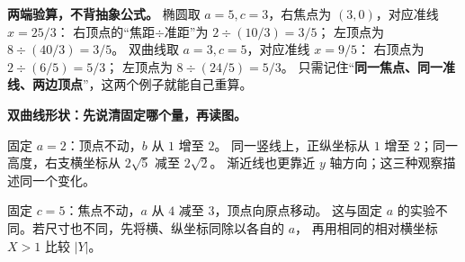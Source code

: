\begin{explanationbox}
\medskip
\textbf{两端验算，不背抽象公式。}
椭圆取 $a=5,c=3$，右焦点为 $(3,0)$，对应准线 $x=25/3$：
右顶点的“焦距$\div$准距”为 $2\div(10/3)=3/5$；
左顶点为 $8\div(40/3)=3/5$。
双曲线取 $a=3,c=5$，对应准线 $x=9/5$：
右顶点为 $2\div(6/5)=5/3$；
左顶点为 $8\div(24/5)=5/3$。
只需记住“\textbf{同一焦点、同一准线、两边顶点}”，这两个例子就能自己重算。


\medskip
\textbf{双曲线形状：先说清固定哪个量，再读图。}

固定 $a=2$：顶点不动，$b$ 从 $1$ 增至 $2$。
同一竖线上，正纵坐标从 $1$ 增至 $2$；同一高度，右支横坐标从 $2\sqrt5$ 减至 $2\sqrt2$。
渐近线也更靠近 $y$ 轴方向；这三种观察描述同一个变化。

固定 $c=5$：焦点不动，$a$ 从 $4$ 减至 $3$，顶点向原点移动。
这与固定 $a$ 的实验不同。若尺寸也不同，先将横、纵坐标同除以各自的 $a$，
再用相同的相对横坐标 $X>1$ 比较 $|Y|$。
\end{explanationbox}
\clearpage

